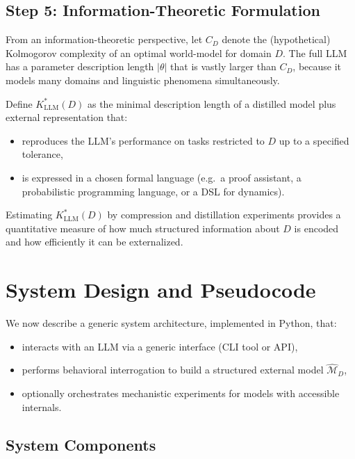 \documentclass[11pt]{article}
\begin{document}
	\subsection{Step 5: Information-Theoretic Formulation}
	
	From an information-theoretic perspective, let $C_D$ denote the (hypothetical) Kolmogorov complexity of an optimal world-model for domain $D$. The full LLM has a parameter description length $|\theta|$ that is vastly larger than $C_D$, because it models many domains and linguistic phenomena simultaneously.
	
	Define $K^*_{\mathrm{LLM}}(D)$ as the minimal description length of a distilled model plus external representation that:
	\begin{itemize}[nosep]
		\item reproduces the LLM's performance on tasks restricted to $D$ up to a specified tolerance,
		\item is expressed in a chosen formal language (e.g.\ a proof assistant, a probabilistic programming language, or a DSL for dynamics).
	\end{itemize}
	
	Estimating $K^*_{\mathrm{LLM}}(D)$ by compression and distillation experiments provides a quantitative measure of how much structured information about $D$ is encoded and how efficiently it can be externalized.
	
	\section{System Design and Pseudocode}
	
	We now describe a generic system architecture, implemented in Python, that:
	\begin{itemize}[nosep]
		\item interacts with an LLM via a generic interface (CLI tool or API),
		\item performs behavioral interrogation to build a structured external model $\hat{\mathcal{M}}_D$,
		\item optionally orchestrates mechanistic experiments for models with accessible internals.
	\end{itemize}
	
	\subsection{System Components}
	
\end{document}
